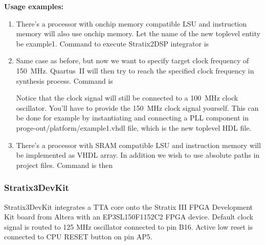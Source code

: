 \documentclass[twoside]{tceusermanual}
\begin{document}
\textbf{Usage examples:} 
\begin{enumerate}

 \item There's a processor with onchip memory compatible LSU and instruction
memory will also use onchip memory. Let the name of the new toplevel entity
be example1. Command to execute Stratix2DSP integrator is \\

\item Same case as before, but now we want to specify target clock frequency
of 150~MHz. Quartus~II will then try to reach the specified clock frequency in
synthesis process. Command is \\

Notice that the clock signal will still be connected to a 100~MHz clock
oscillator. You'll have to provide the 150~MHz clock signal yourself. This can
be done for example by instantiating and connecting a PLL component in
proge-out/platform/example1.vhdl file, which is the new toplevel HDL file.

\item There's a processor with SRAM compatible LSU and instruction memory will
be implemented as VHDL array. In addition we wish to use absolute paths in
project files. Command is then \\

\end{enumerate}

\subsubsection{Stratix3DevKit}
\label{stratix3devkitIntegrator}

Stratix3DevKit integrates a TTA core onto the Stratix III FPGA
Development Kit board from Altera with an EP3SL150F1152C2 FPGA
device. Default clock signal is routed to 125 MHz oscillator connected
to pin B16. Active low reset is connected to CPU RESET button on pin
AP5.
\end{document}
